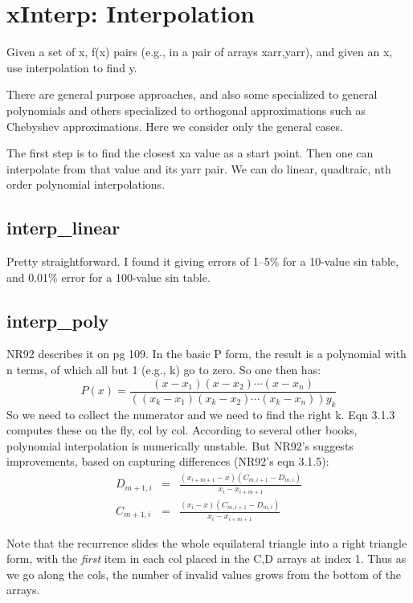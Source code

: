 \section{xInterp: Interpolation}
Given a set of x, f(x) pairs (e.g., in a pair of arrays
xarr,yarr), and given an x, use interpolation to find y.

There are general purpose approaches, and also some
specialized to general polynomials and others specialized to 
orthogonal approximations
such as Chebyshev approximations.  Here we consider only the
general cases.

The first step is to find the closest xa value as a start
point.  Then one can interpolate from that value and its
yarr pair.  We can do linear, quadtraic, nth order
polynomial interpolations.

\subsection*{interp\_linear}
Pretty straightforward.  I found it giving errors of 1--5\%
for a 10-value sin table, and 0.01\% error for a 100-value
sin table.

\subsection*{interp\_poly}
NR92 describes it on pg 109.  In the basic P form, the
result is a polynomial with n terms, of which all but 1
(e.g., k) go to zero.  So one then has:
\begin{equation}
     P(x)=\frac{(x-x_1)(x-x_2) \cdots (x-x_n)}
                 {((x_k-x_1)(x_k-x_2) \cdots (x_k-x_n))y_k}
\end{equation}
So we need to collect the numerator and we need to find the
right k.  Eqn 3.1.3 computes these on the fly, col by col.
According to several other books, polynomial interpolation
is numerically unstable.  But NR92's suggests improvements, based on
capturing differences (NR92's eqn 3.1.5):
\begin{eqnarray}
  D_{m+1,i} & = & \frac{(x_{i+m+1}-x)(C_{m,i+1}-D_{m,i})}{x_i-x_{i+m+1}}\\
  C_{m+1,i} & = & \frac{(x_{i}    -x)(C_{m,i+1}-D_{m,i})}{x_i-x_{i+m+1}}
\end{eqnarray}


Note that the recurrence
slides the whole equilateral triangle into a right triangle
form, with the {\em first} item in each col placed in the C,D
arrays at index 1.  Thus as we go along the cols, the number
of invalid values grows from the bottom of the arrays.

